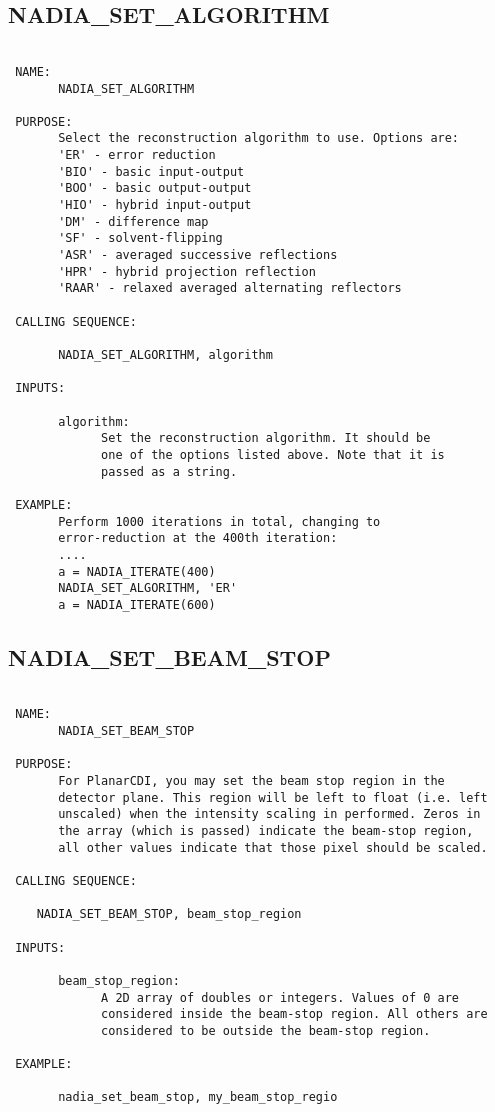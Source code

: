 \subsection{NADIA\_SET\_ALGORITHM}
\begin{verbatim}

 NAME:
       NADIA_SET_ALGORITHM

 PURPOSE:
       Select the reconstruction algorithm to use. Options are:
       'ER' - error reduction 
       'BIO' - basic input-output 
       'BOO' - basic output-output 
       'HIO' - hybrid input-output 
       'DM' - difference map 
       'SF' - solvent-flipping 
       'ASR' - averaged successive reflections 
       'HPR' - hybrid projection reflection 
       'RAAR' - relaxed averaged alternating reflectors

 CALLING SEQUENCE:

       NADIA_SET_ALGORITHM, algorithm

 INPUTS:

       algorithm:
             Set the reconstruction algorithm. It should be
             one of the options listed above. Note that it is
             passed as a string.

 EXAMPLE:
       Perform 1000 iterations in total, changing to 
       error-reduction at the 400th iteration:
       ....
       a = NADIA_ITERATE(400)
       NADIA_SET_ALGORITHM, 'ER'
       a = NADIA_ITERATE(600)

\end{verbatim}






  
 
\subsection{NADIA\_SET\_BEAM\_STOP}
\begin{verbatim}

 NAME:
       NADIA_SET_BEAM_STOP

 PURPOSE: 
       For PlanarCDI, you may set the beam stop region in the
       detector plane. This region will be left to float (i.e. left
       unscaled) when the intensity scaling in performed. Zeros in
       the array (which is passed) indicate the beam-stop region,
       all other values indicate that those pixel should be scaled.

 CALLING SEQUENCE:

	NADIA_SET_BEAM_STOP, beam_stop_region

 INPUTS:

       beam_stop_region: 
             A 2D array of doubles or integers. Values of 0 are
             considered inside the beam-stop region. All others are
             considered to be outside the beam-stop region.

 EXAMPLE:

       nadia_set_beam_stop, my_beam_stop_regio


\end{verbatim}






